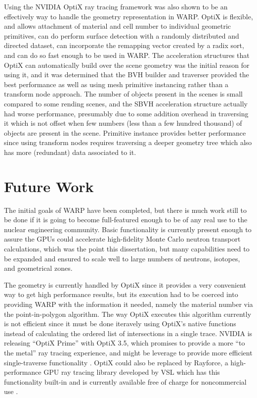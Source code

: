 Using the NVIDIA OptiX ray tracing framework was also shown to be an effectively way to handle the geometry representation in WARP.  OptiX is flexible, and allows attachment of material and cell number to individual geometric primitives, can do perform surface detection with a randomly distributed and directed dataset, can incorporate the remapping vector created by a radix sort, and can do so fast enough to be used in WARP.  The acceleration structures that OptiX can automatically build over the scene geometry was the initial reason for using it, and it was determined that the BVH builder and traverser provided the best performance as well as using mesh primitive instancing rather than a transform node approach.  The number of objects present in the scenes is small compared to some rending scenes, and the SBVH acceleration structure actually had worse performance, presumably due to some addition overhead in traversing it which is not offset when few numbers (less than a few hundred thousand) of objects are present in the scene.  Primitive instance provides better performance since using transform nodes requires traversing a deeper geometry tree which also has more (redundant) data associated to it.

\section{Future Work}

The initial goals of WARP have been completed, but there is much work still to be done if it is going to become full-featured enough to be of any real use to the nuclear engineering community.  Basic functionality is currently present enough to assure the GPUs could accelerate high-fidelity Monte Carlo neutron transport calculations, which was the point this dissertation, but many capabilities need to be expanded and ensured to scale well to large numbers of neutrons, isotopes, and geometrical zones.

The geometry is currently handled by OptiX since it provides a very convenient way to get high performance results, but its execution had to be coerced into providing WARP with the information it needed, namely the material number via the point-in-polygon algorithm.  The way OptiX executes this algorithm currently is not efficient since it must be done iteravely using OptiX's native functions instead of calculating the ordered list of intersections in a single trace.  NVIDIA is releasing ``OptiX Prime'' with OptiX 3.5, which promises to provide a more ``to the metal'' ray tracing experience, and might be leverage to provide more efficient single-traverse functionality \cite{optix3.5}.  OptiX could also be replaced by Rayforce, a high-performance GPU ray tracing library developed by VSL which has this functionality built-in and is currently available free of charge for noncommercial use \cite{rayforce}.

